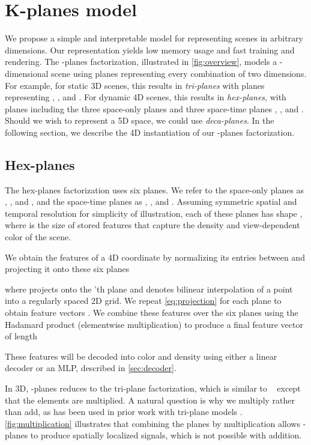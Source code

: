 \documentclass[10pt,twocolumn,letterpaper]{article}
\makeatletter
\newcommand{\modelname}{-planes}
\renewcommand{\paragraph}{\@startsection{paragraph}{4}{\z@}{0.65ex \@plus 1ex \@minus .2ex}{-1em}{\normalfont \normalsize \bfseries }}
\makeatother
\begin{document}
 \section{K-planes model}
\label{sec:method}


We propose a simple and interpretable model for representing scenes in arbitrary dimensions. 
Our representation yields low memory usage and fast training and rendering. 
The \modelname{} factorization, illustrated in \cref{fig:overview}, models a -dimensional scene using  planes representing every combination of two dimensions. For example, for static 3D scenes, this results in \emph{tri-planes} with  planes representing , , and . For dynamic 4D scenes, this results in \emph{hex-planes}, with  planes including the three space-only planes and three space-time planes , , and . Should we wish to represent a 5D space, we could use  \emph{deca-planes}. In the following section, we describe the 4D instantiation of our \modelname{} factorization. 


\subsection{Hex-planes}\label{sec:kplane}


The hex-planes factorization uses six planes. We refer to the space-only planes as , , and , and the space-time planes as , , and . Assuming symmetric spatial and temporal resolution  for simplicity of illustration, each of these planes has shape , where  is the size of stored features that capture the density and view-dependent color of the scene. 

We obtain the features of a 4D coordinate  by normalizing its entries between  and projecting it onto these six planes 

where  projects  onto the 'th plane and  denotes bilinear interpolation of a point into a regularly spaced 2D grid. We repeat \cref{eq:projection} for each plane  to obtain feature vectors . We combine these features over the six planes using the Hadamard product (elementwise multiplication) to produce a final feature vector of length 

These features will be decoded into color and density using either a linear decoder or an MLP, described in \cref{sec:decoder}.

\paragraph{Why Hadamard product?}
\label{sec:hadamard} 
In 3D, \modelname{} reduces to the tri-plane factorization, which is similar to ~\cite{triplane} except that the elements are multiplied. A natural question is why we multiply rather than add, as has been used in prior work with tri-plane models \cite{triplane, convtriplane}.
\cref{fig:multiplication} illustrates that combining the planes by multiplication allows \modelname{} to produce spatially localized signals, which is not possible with addition.
\end{document}
